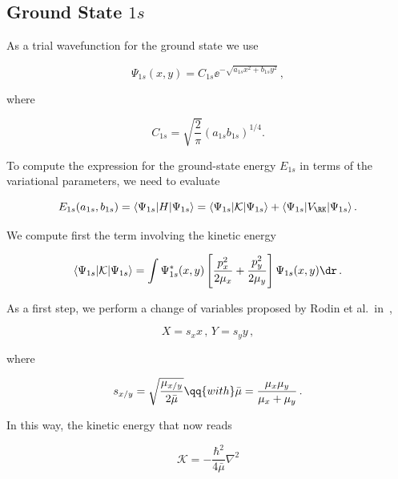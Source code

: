 \subsection{Ground State $1s$}
\label{subsec:ground_state_1s}

As a trial wavefunction for the ground state we use

\begin{equation}
    \Psi_{1s}(x,y)=C_{1s} \ee^{-\sqrt{a_{1s}x^{2}+b_{1s}y^{2}}}\,,
\end{equation}

\noindent where

\begin{equation}
C_{1s} = \sqrt{\frac{2}{\pi}}\left(a_{1s}b_{1s}\right)^{1/4}.
\end{equation}

\noindent To compute the expression for the ground-state energy $E_{1s}$ in terms of the variational parameters, we need to evaluate

\begin{equation}
    E_{1s}\!\left(a_{1s},b_{1s}\right)=\langle\Psi_{1s}|H|\Psi_{1s}\rangle=\langle\Psi_{1s}|\mathcal{K}|\Psi_{1s}\rangle+\langle\Psi_{1s}|V_{\RK}|\Psi_{1s}\rangle\,.
\end{equation}

\noindent We compute first the term involving the kinetic energy

\begin{equation}
    \label{eq:integral_in_x_y}
    \langle\Psi_{1s}|\mathcal{K}|\Psi_{1s}\rangle = \int \Psi_{1s}^{*}(x,y)\left[\frac{p_{x}^{2}}{2\mu_{x}}+\frac{p_{y}^{2}}{2\mu_{y}}\right]\Psi_{1s}(x,y) \dr \,.
\end{equation}

\noindent As a first step, we perform a change of variables proposed by Rodin et al.~in~\cite{Rodin_Carvalho_Castro_Neto_2014},

\begin{equation}
    X= s_{x} x\,,\,Y = s_{y}y\,,
\end{equation}

\noindent where

\begin{equation}
    s_{x/y}=\sqrt{\frac{\mu_{x/y}}{2\bar{\mu}}} \qq{with} \bar{\mu} = \frac{\mu_{x}\mu_{y}}{\mu_{x}+\mu_{y}}\,.
\end{equation}

\noindent In this way, the kinetic energy that now reads

\begin{equation}
\mathcal{K} = -\frac{\hbar^{2}}{4\bar{\mu}}\nabla^{2}
\end{equation}

